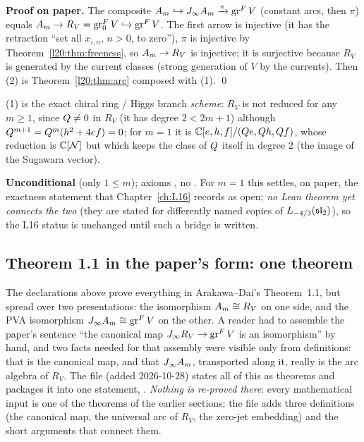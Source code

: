 \textbf{Proof on paper.} The composite $A_m\hookrightarrow J_\infty A_m\xrightarrow{\pi}\operatorname{gr}^F V$ (constant arcs,
then $\pi$) equals $A_m\to R_V=\operatorname{gr}^F_0V\hookrightarrow\operatorname{gr}^F V$. The first arrow is injective (it has the
retraction ``set all $x_{i,n}$, $n>0$, to zero''), $\pi$ is injective by Theorem~\ref{l20:thm:freeness}, so
$A_m\to R_V$ is injective; it is surjective because $R_V$ is generated by the current classes (strong
generation of $V$ by the currents). Then (2) is Theorem~\ref{l20:thm:arc} composed with (1). \qed

\begin{physics}
(1) is the exact chiral ring / Higgs branch \emph{scheme}: $R_V$ is not reduced for any $m\ge1$, since
$Q\neq0$ in $R_V$ (it has degree $2<2m+1$) although $Q^{m+1}=Q^m(h^2+4ef)=0$; for $m=1$ it is
${\mathbb{C}}[e,h,f]/(Q e,Q h,Q f)$, whose reduction is ${\mathbb{C}}[\mathcal N]$ but which keeps the class of $Q$
itself in degree 2 (the image of the Sugawara vector).
\end{physics}

\begin{status}
\textbf{Unconditional} (only $1\le m$); axioms , no .
For $m=1$ this settles, on paper, the exactness statement  that Chapter~\ref{ch:L16}
records as open; \emph{no Lean theorem yet connects the two} (they are stated for differently named copies of
$L_{-4/3}(\mathfrak{sl}_2)$), so the L16 status is unchanged until such a bridge is written.
\end{status}

\subsection{Theorem 1.1 in the paper's form: one theorem}\label{l20:sec:ad11}

The declarations above prove everything in Arakawa--Dai's Theorem~1.1, but spread over two presentations: the isomorphism
$A_m\cong R_V$ on one side, and the PVA isomorphism $J_\infty A_m\cong\operatorname{gr}^F V$ on the other. A reader had to
assemble the paper's sentence ``the canonical map $J_\infty R_V\to\operatorname{gr}^F V$ is an isomorphism'' by hand, and two facts
needed for that assembly were visible only from definitions: that  is the canonical map, and that
$J_\infty A_m$, transported along it, really is the arc algebra of $R_V$. The file
 (added 2026-10-28) states all of this as theorems
and packages it into one statement, . \emph{Nothing is re-proved there}: every mathematical input
is one of the theorems of the earlier sections; the file adds three definitions (the canonical map, the universal arc of $R_V$,
the zero-jet embedding) and the short arguments that connect them.

